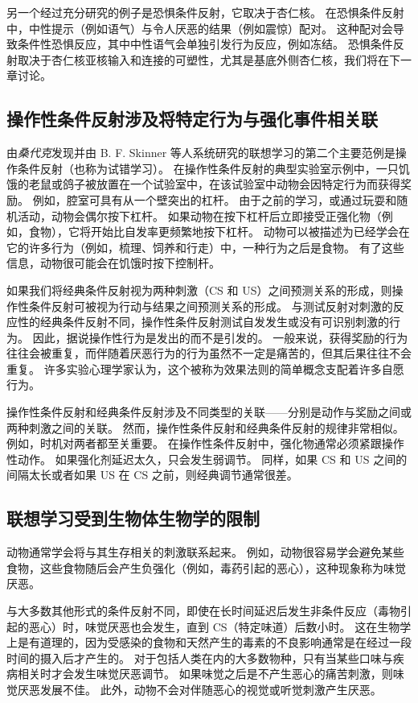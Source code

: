 另一个经过充分研究的例子是恐惧条件反射，它取决于杏仁核。
在恐惧条件反射中，中性提示（例如语气）与令人厌恶的结果（例如震惊）配对。
这种配对会导致条件性恐惧反应，其中中性语气会单独引发行为反应，例如冻结。
恐惧条件反射取决于杏仁核亚核输入和连接的可塑性，尤其是基底外侧杏仁核，我们将在下一章讨论。



\subsection{操作性条件反射涉及将特定行为与强化事件相关联}

由\textit{桑代克}发现并由 B. F. Skinner 等人系统研究的联想学习的第二个主要范例是操作条件反射（也称为试错学习）。
在操作性条件反射的典型实验室示例中，一只饥饿的老鼠或鸽子被放置在一个试验室中，在该试验室中动物会因特定行为而获得奖励。
例如，腔室可具有从一个壁突出的杠杆。 由于之前的学习，或通过玩耍和随机活动，动物会偶尔按下杠杆。
如果动物在按下杠杆后立即接受正强化物（例如，食物），它将开始比自发率更频繁地按下杠杆。
动物可以被描述为已经学会在它的许多行为（例如，梳理、饲养和行走）中，一种行为之后是食物。
有了这些信息，动物很可能会在饥饿时按下控制杆。


如果我们将经典条件反射视为两种刺激（CS 和 US）之间预测关系的形成，则操作性条件反射可被视为行动与结果之间预测关系的形成。
与测试反射对刺激的反应性的经典条件反射不同，操作性条件反射测试自发发生或没有可识别刺激的行为。
因此，据说操作性行为是发出的而不是引发的。
一般来说，获得奖励的行为往往会被重复，而伴随着厌恶行为的行为虽然不一定是痛苦的，但其后果往往不会重复。
许多实验心理学家认为，这个被称为效果法则的简单概念支配着许多自愿行为。


操作性条件反射和经典条件反射涉及不同类型的关联——分别是动作与奖励之间或两种刺激之间的关联。
然而，操作性条件反射和经典条件反射的规律非常相似。 例如，时机对两者都至关重要。
在操作性条件反射中，强化物通常必须紧跟操作性动作。
如果强化剂延迟太久，只会发生弱调节。
同样，如果 CS 和 US 之间的间隔太长或者如果 US 在 CS 之前，则经典调节通常很差。



\subsection{联想学习受到生物体生物学的限制}

动物通常学会将与其生存相关的刺激联系起来。
例如，动物很容易学会避免某些食物，这些食物随后会产生负强化（例如，毒药引起的恶心），这种现象称为味觉厌恶。


与大多数其他形式的条件反射不同，即使在长时间延迟后发生非条件反应（毒物引起的恶心）时，味觉厌恶也会发生，直到 CS（特定味道）后数小时。
这在生物学上是有道理的，因为受感染的食物和天然产生的毒素的不良影响通常是在经过一段时间的摄入后才产生的。
对于包括人类在内的大多数物种，只有当某些口味与疾病相关时才会发生味觉厌恶调节。
如果味觉之后是不产生恶心的痛苦刺激，则味觉厌恶发展不佳。
此外，动物不会对伴随恶心的视觉或听觉刺激产生厌恶。



